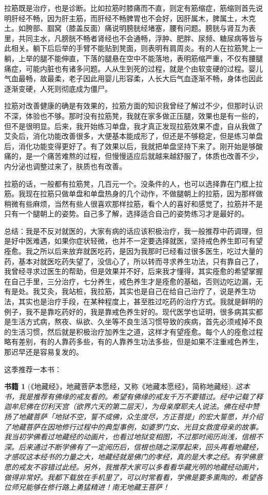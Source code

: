 \documentclass{ctexart}
\newtheorem{book}{书籍}
\begin{document}
拉筋既是治疗，也是诊断。比如拉筋时膝痛而不直，则定有筋缩症，筋缩则首先说明肝经不畅，因为肝主筋，而肝经不畅脾胃也不会好，因肝属木，脾属土，木克土。如胯部、腘窝（膝盖反面）痛说明膀胱经堵塞，腰有问题。膀胱与肾互为表里，共同主水，凡膀胱不畅者肾经也不会通畅，浮肿、肥胖、尿频、糖尿病等皆与此相关。躺下后后举的手臂不能贴到凳面，则表明有肩周炎。有的人在拉筋凳上一躺，上举的腿不能伸直，下落的腿悬在空中不能落地，表明筋缩严重，不仅有腰腿痛症，可能内脏也有诸多问题。人从生到死的过程，就是个由软变硬的过程。婴儿气血最畅，故最柔，老子因此用婴儿形容柔，人长大后气血逐渐不畅，身体也因此逐渐变硬，人死则彻底成为僵尸。

拉筋对改善健康的确是有效果的，拉筋方面的知识我曾经了解过不少，但那时认识不深，体验也不够。那时没有拉筋凳，我就在家多做正压腿，效果也是有一些的，但不是很明显。后来，我开始练习单盘，我才真正发现拉筋效果不虚，自从我做了艾灸后，消化功能改善很多，大便基本能成形了，但还是不够稳定，但是练习单盘后，消化功能变得更好了。有了效果以后，我就把单盘坚持下来了。刚开始是够酸痛的，是一个痛苦难熬的过程，但慢慢适应后就越来越舒服了，体质也改善不少，内分泌也调整过来了，肤质也有改善。

拉筋的话，一般都有拉筋凳，几百元一个。没条件的人，也可以选择靠在门框上拉筋。我现在拉筋只做单盘和单盘热身的几个动作，不做腿朝上的拉筋，因为那样做稍微有些麻烦，当然有些人很喜欢那样拉筋，看个人的喜好和感觉了，拉筋并不是只有一个腿朝上的姿势。自己多了解，选择适合自己的姿势练习才是最好的。

总结：我是不反对就医的，大家有病的话应该积极治疗，我一般推荐中药调理，但是好中医难遇，如果你症状轻微，也并不一定要选择就医，坚持戒色养生即可有望痊愈。我之所以后来放弃就医吃药，是因为我那时已经看过很多医生，吃过大量的药，基本对就医吃药失望了，没信心了，所以转而寻求养生功法，只有靠自己了，我曾经寻求过医生的帮助，但是效果并不好，后来我才懂得，其实痊愈的希望掌握在自己手里，三分治疗，七分养生，戒色养生才是痊愈的基础，否则边吃边漏，无有是处。我艾灸，我站桩，我拉筋，其实也是自己在给自己治疗了，说是养生功法，其实也是治疗手段，在某种程度上，甚至胜过吃药的治疗方式。我就是鲜明的例子，我不是靠吃药好的，我是靠戒色养生好的。现代医学也证明，很多病其实都是生活方式病，熬夜、纵欲、久坐等不良生活习惯导致的疾病，首先必须戒掉不良的生活习惯，然后就是积极治疗加养生之道，这样才有望痊愈。每个人的痊愈过程略有差别，有的人靠药多些，有的人靠养生功法多些，但是如果不注重戒色养生，那迟早还是容易复发的。

这季推荐一本书：

\begin{book}[《地藏经》，地藏菩萨本愿经，又称《地藏本愿经》，简称地藏经]
    这本书，我是推荐有佛缘的戒友看的。希望有佛缘的戒友千万不要错过。经中记载了释迦牟尼佛在忉利天宫（欲界六天的第二层天），为母亲摩耶夫人说法。佛在经中赞扬了地藏菩萨「地狱不空，誓不成佛，众生度尽，方正菩提」的宏大誓愿，并介绍了地藏菩萨在因地修行过程中的典型事例，如婆罗门女、光目女救度母亲的故事。我当初学佛看过地藏经的动画片，也看过地狱变相图，不过那时阅历尚浅，信根不深。后来通过不断学佛有了一定阅历后，信根也随之深厚起来，回头再看地藏经，才感叹这本经书的力量之大，地藏经就是佛门的孝经，真的是大孝之经。有学佛意愿的戒友不容错过此经。另外，我推荐大家可以多看看华藏光明的地藏经动画片，做得非常好。我都下载放在手机里了，可以时常看看，学佛是要多熏陶的，希望各位师兄能够在修行路上勇猛精进！南无地藏王菩萨！
\end{book}
\end{document}
